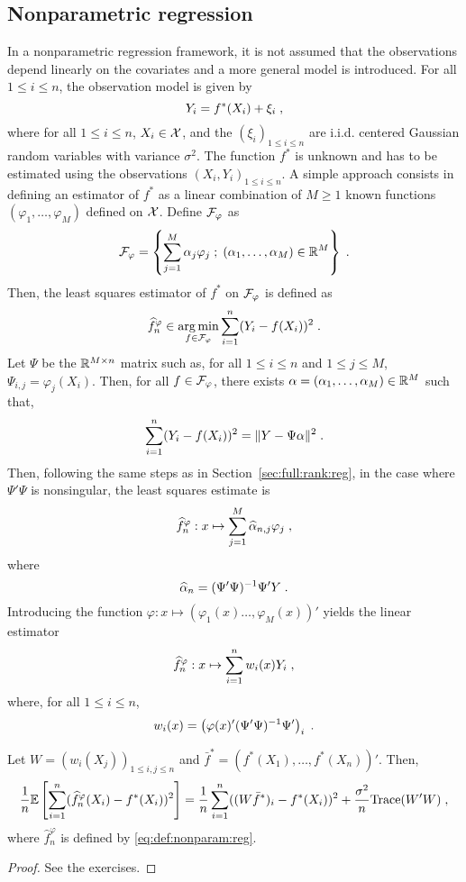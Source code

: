 \subsection{Nonparametric regression}
In a nonparametric regression framework, it is not assumed that the observations depend linearly on the covariates and a more general model is introduced. For all $1\leqslant i\leqslant n$, the observation model is given by
\[
Y_{i}=f^*(X_{i})+\xi_{i}\;,
\]
where for all $1\leqslant i\leqslant n$, $X_i\in\mathcal{X}$, and the $(\xi_{i})_{1\leqslant i \leqslant n}$ are i.i.d. centered Gaussian random variables with variance $\sigma^2$. The function $f^*$ is unknown and has to be estimated using the observations $(X_i,Y_i)_{1\leqslant i\leqslant n}$. A simple approach consists in defining an estimator of $f^*$ as a linear combination of $M\geqslant 1$ known functions $(\varphi_1,\ldots,\varphi_M)$ defined on $\mathcal{X}$. Define $\mathcal{F}_\varphi$ as
\[
\mathcal{F}_\varphi = \left\{\sum_{j=1}^M \alpha_j \varphi_j\;;\; (\alpha_1,\ldots,\alpha_M)\in\mathbb{R}^M\right\}\;.
\]
Then, the least squares estimator of $f^*$ on $\mathcal{F}_\varphi$ is defined as
\[
\widehat f^\varphi_n\in  \argmin_{f \in \calF_\varphi}  \sum_{i=1}^n(Y_i - f(X_i))^2\eqsp.
\]
Let $\Psi$ be the $\mathbb{R}^{M\times n}$ matrix such as, for all $1\leqslant i\leqslant n$ and $1\leqslant j\leqslant M$, $\Psi_{i,j} = \varphi_j(X_i)$. Then, for all $f \in \mathcal{F}_\varphi$, there exists $\alpha = (\alpha_1,\ldots,\alpha_M)\in\mathbb{R}^M$ such that,
\[
 \sum_{i=1}^n(Y_i - f(X_i))^2 = \|Y - \Psi \alpha\|^2\;.
\]
Then, following the same steps as in Section~\ref{sec:full:rank:reg}, in the case where $\Psi' \Psi$ is nonsingular, the least squares estimate is
\begin{equation}
\label{eq:def:nonparam:reg}
\widehat f^\varphi_n: x\mapsto \sum_{j=1}^M \widehat\alpha_{n,j} \varphi_j\;,
\end{equation}
where
\[
\widehat\alpha_{n} = (\Psi' \Psi)^{-1}\Psi'Y\;.
\]
Introducing the function $\varphi: x\mapsto (\varphi_1(x)\ldots,\varphi_M(x))'$ yields the linear estimator 
\[
\widehat f^\varphi_n: x \mapsto \sum_{i = 1}^n w_i(x)Y_i\;,
\]
where, for all $1\leqslant i\leqslant n$,
\[
w_i(x) = \left(\varphi(x)'(\Psi' \Psi)^{-1}\Psi'\right)_i\;.
\]

\begin{shaded}
\begin{proposition}
Let  $W = (w_i(X_j))_{1\leqslant i,j \leqslant n}$ and $\bar f^* = (f^*(X_1),\ldots,f^*(X_n))'$. Then,
\[
\frac{1}{n}\mathbb{E}\left[\sum_{i=1}^n(\widehat f^\varphi_n(X_i) - f^*(X_i))^2\right] = \frac{1}{n}\sum_{i=1}^n((W\bar f^*)_i - f^*(X_i))^2 + \frac{\sigma^2}{n}\mathrm{Trace}(W'W)\;,
\]
where $\widehat f^\varphi_n$  is defined by \eqref{eq:def:nonparam:reg}.
\end{proposition}
\end{shaded}
\begin{proof}
See the exercises.
\end{proof}
